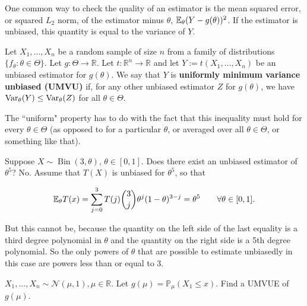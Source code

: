 One common way to check the quality of an estimator is the mean squared error, or squared \(L_2\) norm, of the estimator minus \(\theta\), \(\E_\theta(Y- g(\theta))^2\). If the estimator is unbiased, this quantity is equal to the variance of \(Y\).

\begin{definition}Let \(X_1, \ldots, X_n\) be a random sample of size \(n\) from a family of distributions \(\{f_\theta: \theta \in \Theta\}\). Let \(g: \Theta \to \mathbb{R}\). Let \(t: \mathbb{R}^n \to \mathbb{R}\) and let \(Y:= t(X_1, \ldots, X_n)\) be an unbiased estimator for \(g(\theta)\). We say that \(Y\) is \textbf{uniformly minimum variance unbiased (UMVU)} if, for any other unbiased estimator \(Z\) for \(g(\theta)\), we have \(\Var_\theta(Y) \leq \Var_\theta(Z)\) for all \(\theta \in \Theta\).

\end{definition}

\begin{remark}The ``uniform" property has to do with the fact that this inequality must hold for every \(\theta \in \Theta\) (as opposed to for a particular \(\theta\), or averaged over all \(\theta \in \Theta\), or something like that).

\end{remark}

\begin{example}

Suppose \(X \sim \operatorname{Bin}(3, \theta)\), \(\theta \in [0,1]\). Does there exist an unbiased estimator of \(\theta^5\)? No. Assume that \(T(X)\) is unbiased for \(\theta^5\), so that 

\[
\E_\theta T(x) = \sum_{j=0}^3 T(j) \binom{3}{j} \theta^j (1 - \theta)^{3-j} = \theta^5 \qquad \forall \theta \in [0,1].
\]

But this cannot be, because the quantity on the left side of the last equality is a third degree polynomial in \(\theta\) and the quantity on the right side is a 5th degree polynomial. So the only powers of \(\theta\) that are possible to estimate unbiasedly in this case are powers less than or equal to 3.

\end{example}

\begin{example}

\(X_1, \ldots, X_n \sim \mathcal{N}(\mu, 1), \mu \in \mathbb{R}\). Let \(g(\mu) = \mathbb{P}_\mu (X_1 \leq x)\). Find a UMVUE of \(g(\mu)\).

\end{example}

